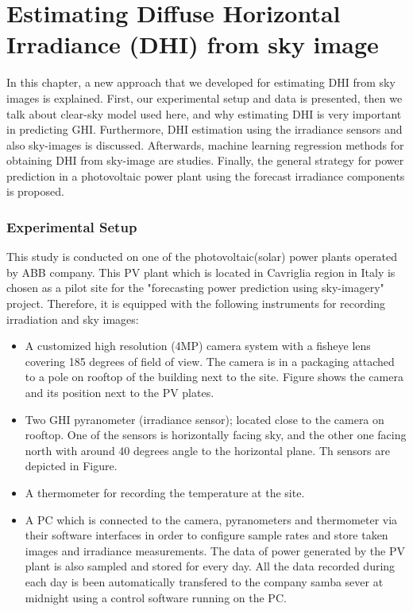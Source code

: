 \chapter{Estimating Diffuse Horizontal Irradiance (DHI) from sky image}
In this chapter, a new approach that we developed for estimating DHI from sky images is explained. First, our experimental setup and data is presented, then we talk about clear-sky model used here, and why estimating DHI is very important in predicting GHI. Furthermore, DHI estimation using the irradiance sensors and also sky-images is discussed. Afterwards, machine learning regression methods for obtaining DHI from sky-image are studies. Finally, the general strategy for power prediction in a photovoltaic power plant using the forecast irradiance components is proposed.

\subsection{Experimental Setup}
This study is conducted on one of the photovoltaic(solar) power plants operated by ABB company. This PV plant which is located in Cavriglia region in Italy is chosen as a pilot site for the "forecasting power prediction using sky-imagery" project. Therefore, it is equipped with the following instruments for recording irradiation and sky images:
\begin{itemize}
\item A customized high resolution (4MP) camera system with a fisheye lens covering 185 degrees of field of view. The camera is in a packaging attached to a pole on rooftop of the building next to the site. Figure shows the camera and its position next to the PV plates.
\item Two GHI pyranometer (irradiance sensor); located close to the camera on rooftop. One of the sensors is horizontally facing sky, and the other one facing north with around 40 degrees angle to the horizontal plane. Th sensors are depicted in Figure.
\item A thermometer for recording the temperature at the site.
\item A PC which is connected to the camera, pyranometers and thermometer via their software interfaces in order to configure sample rates and store taken images and irradiance measurements. The data of power generated by the PV plant is also sampled and stored for every day. All the data recorded during each day is been automatically transfered to the company samba sever at midnight using a control software running on the PC.
\end{itemize}


